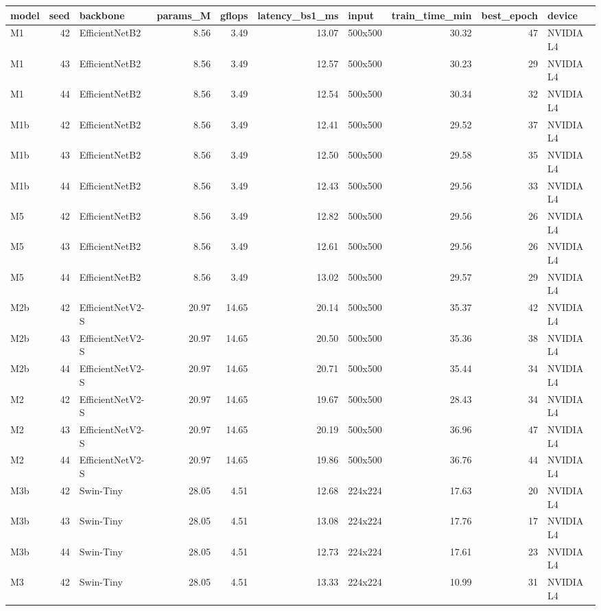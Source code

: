 \begin{tabular}{lrlrrrlrrl}
\toprule
model & seed & backbone & params\_M & gflops & latency\_bs1\_ms & input & train\_time\_min & best\_epoch & device \\
\midrule
M1 & 42 & EfficientNetB2 & 8.56 & 3.49 & 13.07 & 500x500 & 30.32 & 47 & NVIDIA L4 \\
M1 & 43 & EfficientNetB2 & 8.56 & 3.49 & 12.57 & 500x500 & 30.23 & 29 & NVIDIA L4 \\
M1 & 44 & EfficientNetB2 & 8.56 & 3.49 & 12.54 & 500x500 & 30.34 & 32 & NVIDIA L4 \\
M1b & 42 & EfficientNetB2 & 8.56 & 3.49 & 12.41 & 500x500 & 29.52 & 37 & NVIDIA L4 \\
M1b & 43 & EfficientNetB2 & 8.56 & 3.49 & 12.50 & 500x500 & 29.58 & 35 & NVIDIA L4 \\
M1b & 44 & EfficientNetB2 & 8.56 & 3.49 & 12.43 & 500x500 & 29.56 & 33 & NVIDIA L4 \\
M5 & 42 & EfficientNetB2 & 8.56 & 3.49 & 12.82 & 500x500 & 29.56 & 26 & NVIDIA L4 \\
M5 & 43 & EfficientNetB2 & 8.56 & 3.49 & 12.61 & 500x500 & 29.56 & 26 & NVIDIA L4 \\
M5 & 44 & EfficientNetB2 & 8.56 & 3.49 & 13.02 & 500x500 & 29.57 & 29 & NVIDIA L4 \\
M2b & 42 & EfficientNetV2-S & 20.97 & 14.65 & 20.14 & 500x500 & 35.37 & 42 & NVIDIA L4 \\
M2b & 43 & EfficientNetV2-S & 20.97 & 14.65 & 20.50 & 500x500 & 35.36 & 38 & NVIDIA L4 \\
M2b & 44 & EfficientNetV2-S & 20.97 & 14.65 & 20.71 & 500x500 & 35.44 & 34 & NVIDIA L4 \\
M2 & 42 & EfficientNetV2-S & 20.97 & 14.65 & 19.67 & 500x500 & 28.43 & 34 & NVIDIA L4 \\
M2 & 43 & EfficientNetV2-S & 20.97 & 14.65 & 20.19 & 500x500 & 36.96 & 47 & NVIDIA L4 \\
M2 & 44 & EfficientNetV2-S & 20.97 & 14.65 & 19.86 & 500x500 & 36.76 & 44 & NVIDIA L4 \\
M3b & 42 & Swin-Tiny & 28.05 & 4.51 & 12.68 & 224x224 & 17.63 & 20 & NVIDIA L4 \\
M3b & 43 & Swin-Tiny & 28.05 & 4.51 & 13.08 & 224x224 & 17.76 & 17 & NVIDIA L4 \\
M3b & 44 & Swin-Tiny & 28.05 & 4.51 & 12.73 & 224x224 & 17.61 & 23 & NVIDIA L4 \\
M3 & 42 & Swin-Tiny & 28.05 & 4.51 & 13.33 & 224x224 & 10.99 & 31 & NVIDIA L4 \\

\end{tabular}
